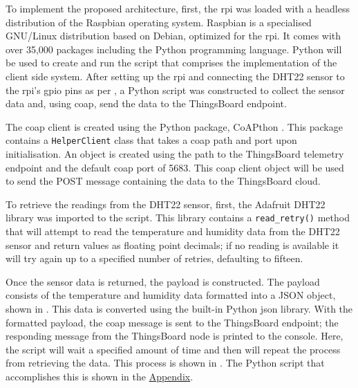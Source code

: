 To implement the proposed architecture, first, the \gls{rpi} was loaded with a 
headless distribution of the Raspbian \citep{raspbian_raspbian_2018} operating system. 
Raspbian is a specialised GNU/Linux distribution based on Debian, optimized for 
the \gls{rpi}. 
It comes with over 35,000 packages including the Python programming language. 
Python will be used to create and run the script that comprises the implementation
of the client side system.
After setting up the \gls{rpi} and connecting the DHT22 sensor to the \gls{rpi}'s
\gls{gpio} pins as per , a Python script was constructed
to collect the sensor data and, using \gls{coap}, send the data to the ThingsBoard
\citep{thingsboard_inc._thingsboard_2018} endpoint. 

The \gls{coap} client is created using the Python package, CoAPthon
\citep{tanganelli_coapthon3_2018}. 
This package contains a \texttt{HelperClient} class that takes a \gls{coap} 
path and port upon initialisation. 
An object is created using the path to the 
ThingsBoard telemetry endpoint and the default \gls{coap} port of 5683.
This \gls{coap} client object will be used to send the POST message containing
the data to the ThingsBoard cloud.

To retrieve the readings from the DHT22 sensor,
first, the Adafruit DHT22 library \citep{adafruit_adafruit_python_dht_2018} 
was imported to the script. This library contains a \texttt{read\_retry()} 
method that will attempt to read the temperature and humidity data from the 
DHT22 sensor and return values as floating point decimals; 
if no reading is available it will try again up to a specified number of retries,
defaulting to fifteen.


Once the sensor data is returned, the payload is constructed. The payload 
consists of the temperature and humidity data formatted into a JSON object, 
shown in . This data is converted using the built-in
Python \gls{json} library. 
With the formatted payload, the \gls{coap} message is sent to the ThingsBoard
endpoint; the responding message from the ThingsBoard node is printed to the console.
Here, the script will wait a specified amount of time and then will repeat the 
process from retrieving the data. This process is shown in 
. The Python script that accomplishes this is 
shown in the \hyperref[app:A]{Appendix}.

